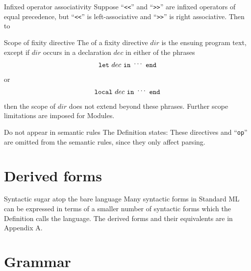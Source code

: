 \begin{example}{Infixed operator associativity}
Suppose ``\verb#<<#'' and ``\verb#>>#'' are infixed operators of equal
precedence, but ``\verb#<<#'' is left-associative and ``\verb#>>#'' is
right associative. Then
\halign to
\end{example}

\begin{definition}{Scope of fixity directive}\label{syntax-core:infixed-operator:scope}
The  of a fixity directive $dir$ is the ensuing program
text, except if $dir$ occurs in a declaration $dec$ in either of the
phrases
\begin{equation*}
\mathtt{let}\ dec\ \mathtt{in}\ \syndots\ \mathtt{end}
\end{equation*}
or
\begin{equation*}
\mathtt{local}\ dec\ \mathtt{in}\ \syndots\ \mathtt{end}
\end{equation*}
then the scope of $dir$ does not extend beyond these phrases. Further
scope limitations are imposed for Modules.
\end{definition}

\begin{clause}{Do not appear in semantic rules}
The Definition states: These directives and ``\texttt{op}'' are omitted
from the semantic rules, since they only affect parsing.
\end{clause}

\section{Derived forms}

\begin{clause}{Syntactic sugar atop the bare language}
Many syntactic forms in Standard ML can be expressed in terms of a
smaller number of syntactic forms which the Definition calls the
 language. The derived forms and their equivalents are in
Appendix A.
\end{clause}

\section{Grammar}

